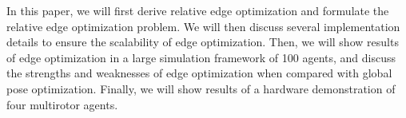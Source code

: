 In this paper, we will first derive relative edge optimization and formulate the relative edge optimization problem.  We will then discuss several implementation details to ensure the scalability of edge optimization.  Then, we will show results of edge optimization in a large simulation framework of 100 agents, and discuss the strengths and weaknesses of edge optimization when compared with global pose optimization.  Finally, we will show results of a hardware demonstration of four multirotor agents.
